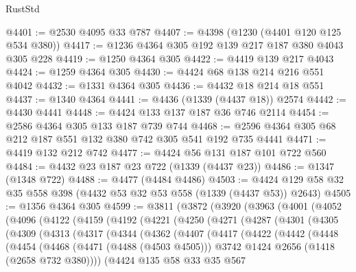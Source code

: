 \begin{lexlean}{RustStd}
\begin{coremodule}
{\begin{coremodule}
{{{{{{{{{{{{{{@4401 := @2530 @4095 @33 @787
@4407 := @4398 (@1230 (@4401 @120 @125 @534 @380))
@4417 := @1236 @4364 @305 @192 @139 @217 @187 @380 @4043 @305 @228
@4419 := @1250 @4364 @305
@4422 := @4419 @139 @217 @4043
@4424 := @1259 @4364 @305
@4430 := @4424 @68 @138 @214 @216 @551 @4042
@4432 := @1331 @4364 @305
@4436 := @4432 @18 @214 @18 @551
@4437 := @1340 @4364
@4441 := @4436 (@1339 (@4437 @18)) @2574
@4442 := @4430 @4441
@4448 := @4424 @133 @137 @187 @36 @746 @2114
@4454 := @2586 @4364 @305 @133 @187 @739 @744
@4468 := @2596 @4364 @305 @68 @212 @187 @551 @132 @380 @742 @305 @541 @192 @735 @4441
@4471 := @4419 @132 @212 @742
@4477 := @4424 @56 @131 @187 @101 @722 @560
@4484 := @4432 @23 @187 @23 @722 (@1339 (@4437 @23))
@4486 := @1347 (@1348 @722)
@4488 := @4477 (@4484 @4486)
@4503 := @4424 @129 @58 @32 @35 @558 @398 (@4432 @53 @32 @53 @558 (@1339 (@4437 @53)) @2643)
@4505 := @1356 @4364 @305
@4599 := @3811
    (@3872
      (@3920
        (@3963
          (@4001
            (@4052
              (@4096
                (@4122
                  (@4159
                    (@4192
                      (@4221
                        (@4250
                          (@4271
                            (@4287
                              (@4301
                                (@4305
                                  (@4309
                                    (@4313
                                      (@4317
                                        (@4344
                                          (@4362
                                            (@4407
                                              (@4417
                                                (@4422
                                                  (@4442
                                                    (@4448
                                                      (@4454
                                                        (@4468
                                                          (@4471 (@4488 (@4503 @4505)))
                                                          @3742
                                                          @1424
                                                          @2656
                                                          (@1418 (@2658 @732 @380))))
                                                      (@4424
                                                        @135
                                                        @58
                                                        @33
                                                        @35
                                                        @567
}}}}}}}}}}}}}}
\end{coremodule}}
\end{coremodule}
\end{lexlean}
